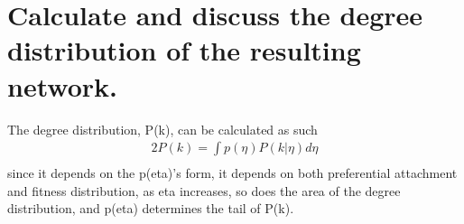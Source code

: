 \documentclass{article}%
\begin{document}
%
\normalsize%
\section{Calculate and discuss the degree distribution of the resulting network.}%
\label{sec:Calculateanddiscussthedegreedistributionoftheresultingnetwork.}%
The degree distribution, P(k), can be calculated as such%
\begin{alignat*}{2}%
P(k)=\int p(\eta )P(k|\eta )d\eta\\%
\end{alignat*}%
since it depends on the p(eta)'s form, it depends on both preferential attachment and fitness distribution, as eta increases, so does the area of the degree distribution, and p(eta) determines the tail of P(k).

%
\end{document}
